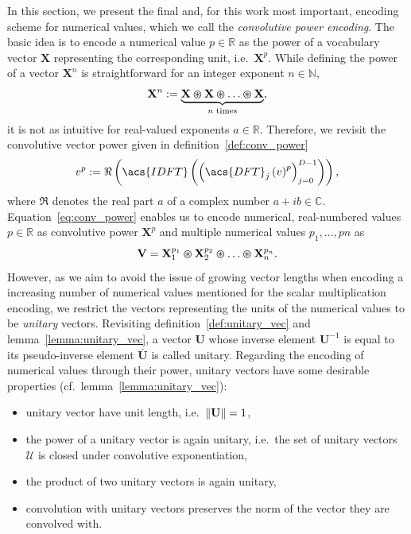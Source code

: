 In this section, we present the final and, for this work most important, encoding scheme for numerical values, which we call the \emph{convolutive power encoding}.
The basic idea is to encode a numerical value $p \in \mathbb{R} $ as the power of a vocabulary vector $ \mathbf{X} $ representing the corresponding unit, i.e.\ $ \mathbf{X}^{p} $.
While defining the power of a vector $ \mathbf{X}^{n} $ is straightforward for an integer exponent $ n \in \mathbb{N} $,
\begin{equation}
\label{eq:vector_power_integer}
\mathbf{X}^{n} := \underbrace{ \mathbf{X} \varoast \mathbf{X} \varoast \ldots \varoast \mathbf{X} }_{\textrm{$n$ times}},
\end{equation}
it is not as intuitive for real-valued exponents $a \in \mathbb{R} $.
Therefore, we revisit the convolutive vector power given in definition~\ref{def:conv_power} 
\begin{equation}
\label{eq:conv_power}
v^{p} := \Re\left(\acs{IDFT} \left(\left(\acs{DFT}_{j}\left(v\right)^{p}\right)_{j=0}^{D-1}\right)\right),
\end{equation}
where $\Re$ denotes the real part $a$ of a complex number $a + ib \in \mathbb{C}$.
Equation~\eqref{eq:conv_power} enables us to encode numerical, real-numbered values $p \in \mathbb{R} $ as convolutive power $ \mathbf{X}^{p}$ and multiple numerical values $ p_{1}, \ldots, p{n}$ as
\begin{equation}
\label{eq:conv_power_several}
\mathbf{V} = \mathbf{X}_{1}^{p_{1}} \varoast \mathbf{X}_{2}^{p_{2}} \varoast \ldots \varoast \mathbf{X}_{n}^{p_{n}}.
\end{equation}
However, as we aim to avoid the issue of growing vector lengths when encoding a increasing number of numerical values mentioned for the scalar multiplication encoding, we restrict the vectors representing the units of the numerical values to be \emph{unitary} vectors.
Revisiting definition~\ref{def:unitary_vec} and lemma~\ref{lemma:unitary_vec}, a vector $ \mathbf{U}$ whose inverse element $ \mathbf{U}^{-1} $ is equal to its pseudo-inverse element $ \bar{\mathbf{U}} $ is called unitary.
Regarding the encoding of numerical values through their power, unitary vectors have some desirable properties (cf.\ lemma~\ref{lemma:unitary_vec}): 
\begin{itemize}
    \item unitary vector have unit length, i.e.\ $\left\|  \mathbf{U}  \right\|=1$,
    \item the power of a unitary vector is again unitary, i.e.\ the set of unitary vectors $ \mathcal{U} $ is closed under convolutive exponentiation,
    \item the product of two unitary vectors is again unitary,
    \item convolution with unitary vectors preserves the norm of the vector they are convolved with.
\end{itemize}

